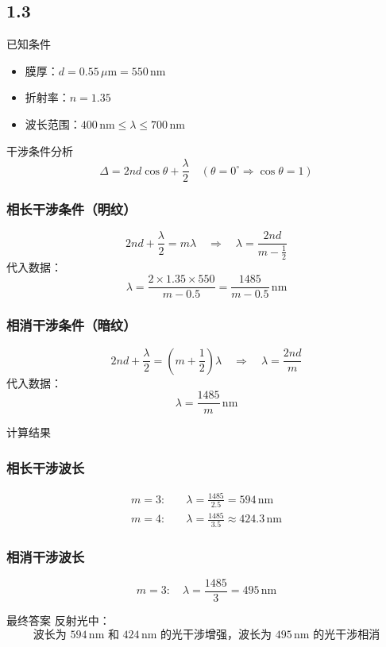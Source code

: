 \documentclass{article}
\begin{document}
\subsection*{1.3}
已知条件
\begin{itemize}
    \item 膜厚：\( d = 0.55 \, \mu\text{m} = 550 \, \text{nm} \)
    \item 折射率：\( n = 1.35 \)
    \item 波长范围：\( 400 \, \text{nm} \leq \lambda \leq 700 \, \text{nm} \)
\end{itemize}

干涉条件分析
\[
\Delta = 2nd\cos\theta + \frac{\lambda}{2} \quad (\theta = 0^\circ \Rightarrow \cos\theta = 1)
\]

\subsubsection*{相长干涉条件（明纹）}
\[
2nd + \frac{\lambda}{2} = m\lambda \quad \Rightarrow \quad \lambda = \frac{2nd}{m - \frac{1}{2}}
\]
代入数据：
\[
\lambda = \frac{2 \times 1.35 \times 550}{m - 0.5} = \frac{1485}{m - 0.5} \, \text{nm}
\]

\subsubsection*{相消干涉条件（暗纹）}
\[
2nd + \frac{\lambda}{2} = \left(m + \frac{1}{2}\right)\lambda \quad \Rightarrow \quad \lambda = \frac{2nd}{m}
\]
代入数据：
\[
\lambda = \frac{1485}{m} \, \text{nm}
\]

计算结果
\subsubsection*{相长干涉波长}
\[
\begin{aligned}
m = 3: & \quad \lambda = \frac{1485}{2.5} = 594 \, \text{nm} \\
m = 4: & \quad \lambda = \frac{1485}{3.5} \approx 424.3 \, \text{nm}
\end{aligned}
\]

\subsubsection*{相消干涉波长}
\[
m = 3: \quad \lambda = \frac{1485}{3} = 495 \, \text{nm}
\]

最终答案
反射光中：
\[
\boxed{\text{波长为 } 594 \, \text{nm} \text{ 和 } 424 \, \text{nm} \text{ 的光干涉增强，波长为 } 495 \, \text{nm} \text{ 的光干涉相消}}
\]
\end{document}

